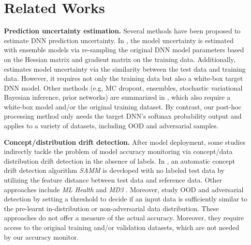 \documentclass{article}
\begin{document}
\section{Related Works}

\textbf{Prediction uncertainty estimation.}
Several methods have been proposed to estimate DNN prediction uncertainty.
 In \cite{model_uncertain_JohnsHopkins_2019}, the model uncertainty is estimated with ensemble models via re-sampling the original DNN model parameters based on the Hessian matrix and gradient matrix on the training data.
Additionally, \cite{classifier_uncertainty_google_nips_2018} estimates model uncertainty via the similarity between the test data and training data. However, it requires not only the training data but also a white-box target DNN model. Other methods (e.g, MC dropout, ensembles, stochastic variational Bayesian inference, prior networks) are summarized in \cite{DNN_Uncertainty_PriorNetworks_NIPS_2018_malinin2018predictive,DNN_Uncertainty_Estimation_Summary_NIPS_2019_ovadia}, which also require a white-box model and/or the original training dataset.
By contrast, our post-hoc
processing method only needs the target DNN's softmax
probability output and applies to a variety
of datasets, including OOD and adversarial samples.

\textbf{Concept/distribution drift detection.} After model deployment,
some studies indirectly tackle the problem
of model accuracy monitoring via concept/data distribution drift detection in the absence of labels.
In \cite{auto_model_monitor_pinto_2019}, an automatic concept drift detection algorithm \emph{SAMM} is developed with no labeled test data by utilizing the feature distance between test data and reference data. Other approaches include
 \emph{ML Health} \cite{ml_health_Ghanta_2019} and \emph{MD3}  \cite{detection_concept_drift_Sethi_2017}.
Moreover, \cite{Verification_DeepVerifier_OOD_Adversarial_Bengio_2019_arXiv,Verification_OOD_Detection_ODIN_Srikant_UIUC_ICLR_2018,Verification_SimpleFramework_OOD_Generative_Gaussian_NIPS_2018_7947}
study OOD and adversarial detection by setting a threshold
to decide if an input data is sufficiently similar to the pre-learnt  in-distribution
or non-adversarial data distribution.
These approaches do not offer a
measure of the actual
accuracy. Moreover, they
require access to the original training and/or validation
datasets, which are not needed by our accuracy
monitor. 
\end{document}
